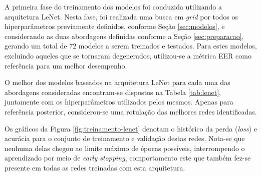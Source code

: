 

A primeira fase do treinamento dos modelos foi conduzida utilizando a arquitetura LeNet. Nesta fase, foi realizada uma busca em \emph{grid} por todos os hiperparâmetros previamente definidos, conforme Seção \ref{sec:modelos}, e considerando as duas abordagens definidas conforme a Seção \ref{sec:preparacao}, gerando um total de $72$ modelos a serem treinados e testados. Para estes modelos, excluindo aqueles que se tornaram degenerados, utilizou-se a métrica EER como referência para um melhor desempenho.

O melhor dos modelos baseados na arquitetura LeNet para cada uma das abordagens consideradas encontram-se dispostos na Tabela \ref{tab:lenet}, juntamente com os hiperparâmetros utilizados pelos mesmos. Apenas para referência posterior, considerou-se uma rotulação das melhores redes identificadas.

\begin{table}[h]
\centering
\caption{Detalhamento dos melhores resultados obtidos com a arquitetura LeNet.}
\label{tab:lenet}
\end{table}


Os gráficos da Figura \ref{fig:treinamento-lenet} denotam o histórico da perda (\emph{loss}) e acurácia para o conjunto de treinamento e validação destas redes. Nota-se que nenhuma delas chegou ao limite máximo de épocas possíveis, interrompendo o aprendizado por meio de \emph{early stopping}, comportamento este que também fez-se presente em todas as redes treinadas com esta arquitetura.

